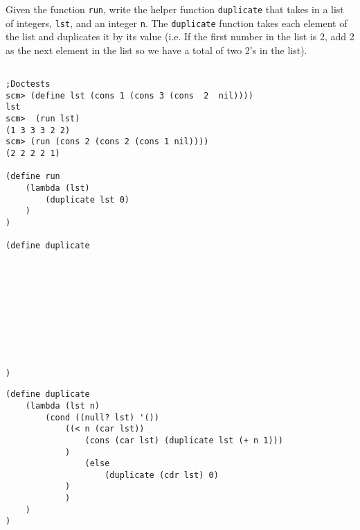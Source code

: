 \begin{blocksection}
\question
Given the function \texttt{run}, write the helper function \texttt{duplicate} that takes in a list of integers, \texttt{lst}, and an integer \texttt{n}. The \texttt{duplicate} function takes each element of the list and duplicates it by its value (i.e. If the first number in the list is 2, add 2 as the next element in the list so we have a total of two 2’s in the list).

\begin{lstlisting}

;Doctests
scm> (define lst (cons 1 (cons 3 (cons  2  nil))))
lst
scm>  (run lst)
(1 3 3 3 2 2)
scm> (run (cons 2 (cons 2 (cons 1 nil))))
(2 2 2 2 1)	

(define run
	(lambda (lst)
		(duplicate lst 0)
	)
)  

(define duplicate










)

\end{lstlisting}
\end{blocksection}

\begin{solution}
\begin{blocksection}
\begin{lstlisting}
(define duplicate
	(lambda (lst n)
		(cond ((null? lst) '())
			((< n (car lst)) 
				(cons (car lst) (duplicate lst (+ n 1)))
			)
          		(else 
          			(duplicate (cdr lst) 0)
	   		)
     		)
   	)
)
\end{lstlisting}
\end{blocksection}
\end{solution}